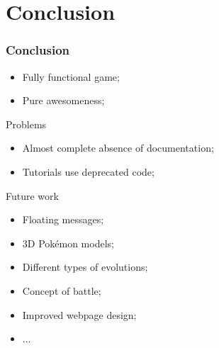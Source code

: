 \documentclass{beamer}
\begin{document}
\section{Conclusion}
\begin{frame}[shrink]
	\frametitle{Conclusion}
	\begin{itemize}
		\item{Fully functional game;}
		\item{Pure awesomeness;}
	\end{itemize}
	
	\begin{block}{Problems}
		\begin{itemize}
			\item{Almost complete absence of documentation;}
			\item{Tutorials use deprecated code;}
		\end{itemize}
	\end{block}
	
	\begin{block}{Future work}
		\begin{itemize}
			\item{Floating messages;}
			\item{3D Pokémon models;}
			\item{Different types of evolutions;}
			\item{Concept of battle;}
			\item{Improved webpage design;}
			\item{$\ldots$}
		\end{itemize}
	\end{block}
\end{frame}
		
\end{document}
